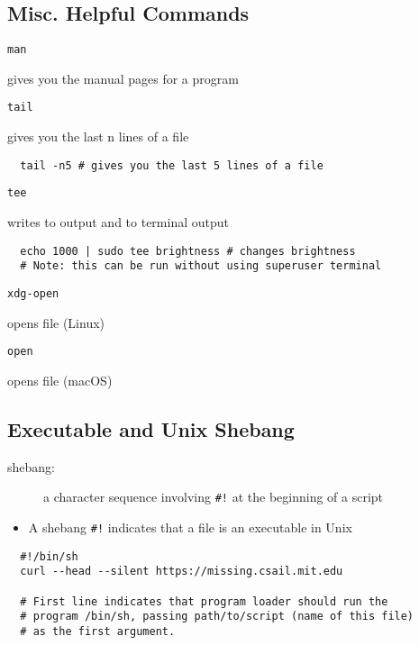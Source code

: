\documentclass[letterpaper,12pt]{article}
\newcommand*{\lstitem}[1]{
  \setbox0\hbox{\lstinline{#1}}
  \item[\usebox0]
}
\begin{document}
\subsection{Misc. Helpful Commands}

\begin{description}
 \lstitem{man} gives you the manual pages for a program
 \lstitem{tail} gives you the last n lines of a file
\end{description}

\begin{lstlisting}
  tail -n5 # gives you the last 5 lines of a file
\end{lstlisting}

\begin{description}
 \lstitem{tee} writes to output and to terminal output
\end{description}

\begin{lstlisting}
  echo 1000 | sudo tee brightness # changes brightness
  # Note: this can be run without using superuser terminal
\end{lstlisting}

\begin{description}
 \lstitem{xdg-open} opens file (Linux)
 \lstitem{open} opens file (macOS)
\end{description}

\subsection{Executable and Unix Shebang}
\begin{description}
 \item[shebang: ] a character sequence involving \lstinline{#!} at the beginning of a script
\end{description}

\begin{itemize}
 \item A shebang \lstinline{#!} indicates that a file is an executable in Unix
\end{itemize}

\begin{lstlisting}
  #!/bin/sh
  curl --head --silent https://missing.csail.mit.edu

  # First line indicates that program loader should run the
  # program /bin/sh, passing path/to/script (name of this file)
  # as the first argument.
\end{lstlisting}
\end{document}
